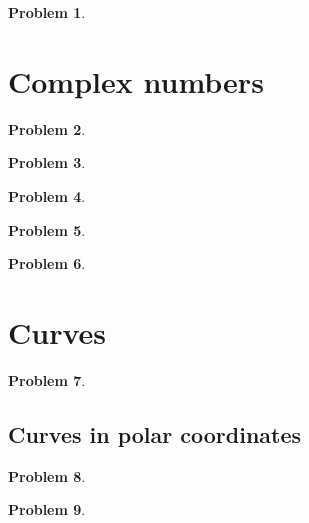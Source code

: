 \documentclass{article}
\newtheorem{problem}{Problem}
\begin{document}
\begin{problem}

\end{problem}

\section{Complex numbers}
\begin{problem}

\end{problem}


\begin{problem}

\end{problem}



\begin{problem}

\end{problem}

\begin{problem}

\end{problem}
\begin{problem}

\end{problem}
\section{Curves}
\begin{problem}

\end{problem}
\subsection{Curves in polar coordinates}
\begin{problem}

\end{problem}
\begin{problem}

\end{problem}

\end{document}
